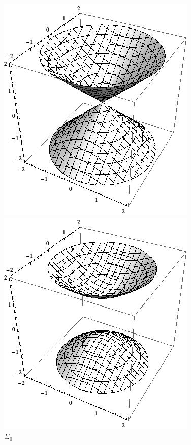 \documentclass[letterpaper,10pt]{article}
\begin{document}
\begin{enumerate}
\begin{enumerate}
\begin{figure}[ht]
\begin{minipage}[b]{0.30\linewidth}
				\includegraphics[width=\textwidth]{images/0.jpeg}
				\caption{$\Sigma_0$}
				\label{fig:figure2}
			\end{minipage}
			\hspace{0.3cm}
			\begin{minipage}[b]{0.30\linewidth}
				\centering
				\includegraphics[width=\textwidth]{images/1.jpeg}

\end{minipage}
\end{figure}
\end{enumerate}
\end{enumerate}
\end{document}
